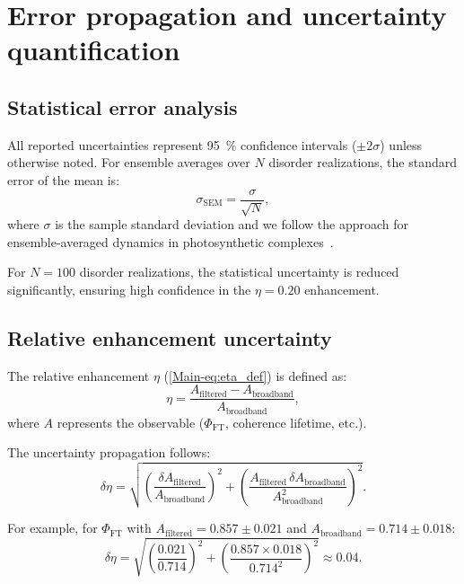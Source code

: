 \documentclass[11pt,a4paper]{article}
\begin{document}
\section{Error propagation and uncertainty quantification}
\label{sec:S10}

\subsection{Statistical error analysis}

All reported uncertainties represent \SI{95}{\percent} confidence intervals ($\pm 2\sigma$) unless otherwise noted. For ensemble averages over $N$ disorder realizations, the standard error of the mean is:
\begin{equation}
\sigma_{\mathrm{SEM}} = \frac{\sigma}{\sqrt{N}},
\label{eq:SEM}
\end{equation}
where $\sigma$ is the sample standard deviation and we follow the approach for ensemble-averaged dynamics in photosynthetic complexes~\cite{Moix2011}.

For $N = 100$ disorder realizations, the statistical uncertainty is reduced significantly, ensuring high confidence in the $\eta = 0.20$ enhancement.

\subsection{Relative enhancement uncertainty}

The relative enhancement $\eta$ (\cref{Main-eq:eta_def}) is defined as:
\begin{equation}
\eta = \frac{A_{\mathrm{filtered}} - A_{\mathrm{broadband}}}{A_{\mathrm{broadband}}},
\label{eq:SI_eta_def}
\end{equation}
where $A$ represents the observable ($\Phi_{\mathrm{FT}}$, coherence lifetime, etc.).

The uncertainty propagation follows:
\begin{equation}
\delta\eta = \sqrt{\left(\frac{\delta A_{\mathrm{filtered}}}{A_{\mathrm{broadband}}}\right)^2 + \left(\frac{A_{\mathrm{filtered}} \, \delta A_{\mathrm{broadband}}}{A_{\mathrm{broadband}}^2}\right)^2}.
\label{eq:error_propagation}
\end{equation}

For example, for $\Phi_{\mathrm{FT}}$ with $A_{\mathrm{filtered}} = 0.857 \pm 0.021$ and $A_{\mathrm{broadband}} = 0.714 \pm 0.018$:
\begin{equation}
\delta\eta = \sqrt{\left(\frac{0.021}{0.714}\right)^2 + \left(\frac{0.857 \times 0.018}{0.714^2}\right)^2} \approx 0.04.
\end{equation}
\end{document}
